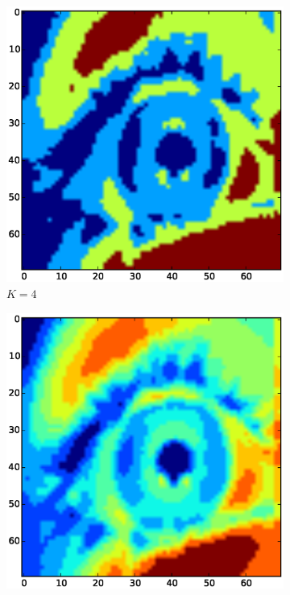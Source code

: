 \documentclass[a4paper,11pt]{article}
\begin{document}
\begin{figure}[ht]
\centering
\begin{subfigure}{.33\textwidth}
  \centering
  \includegraphics[width=1\linewidth]{kmean_k4_v70}
  \caption{$K=4$}
  \label{fig:kmeans_sub1}
\end{subfigure}%
\begin{subfigure}{.33\textwidth}
  \centering
  \includegraphics[width=1\linewidth]{kmean_k10_v70}

\end{subfigure}
\end{figure}
\end{document}
